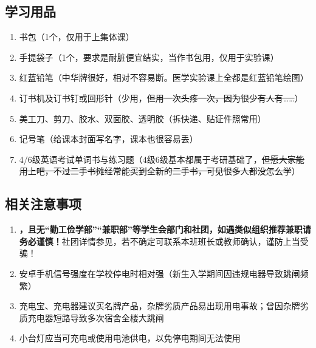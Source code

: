 \subsection[学习用品]{学习用品}
\begin{enumerate}
    \item 书包（1个，仅用于上集体课）
    \item 手提袋子（1个，要求是耐脏便宜结实，当作书包用，仅用于实验课\footnotemark）
    \item 红蓝铅笔（中华牌很好，相对不容易断。医学实验课上全都是红蓝铅笔绘图）
    \item 订书机及订书钉或回形针（少用，\sout{但用一次头疼一次，因为很少有人有……}）
    \item 美工刀、剪刀、胶水、双面胶、透明胶（拆快递、贴证件照常用）
    \item 记号笔（给课本封面写名字，课本也很容易丢）
    \item 4/6级英语考试单词书与练习题（4级6级基本都属于考研基础了，\sout{但愿大家能用上吧，不过\linebreak[3]二手书摊经常能买到全新的二手书，可见很多人都没怎么学}）
\end{enumerate}

\subsection[相关注意事项]{相关注意事项}
\begin{enumerate}
    \item \textbf{，且无“勤工俭学部”“兼职部”等学生会部门和社团，如遇类似组织推荐兼职请务必谨慎！}社团详情参见，若不确定可联系本班班长或教师确认，谨防上当受骗！
    \item 安卓手机信号强度在学校停电时相对强（新生入学期间因违规电器导致跳闸频繁）
    \item 充电宝、充电器建议买名牌产品，杂牌劣质产品易出现用电事故；曾因杂牌劣质充电器短路导致多次宿舍全楼大跳闸
    \item 小台灯应当可充电或使用电池供电，以免停电期间无法使用
\end{enumerate}